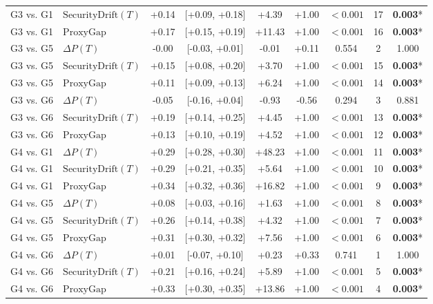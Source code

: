 \begin{table}[t]
\begin{tabular}{llccccccc}
G3 vs. G1 & $\text{SecurityDrift}(T)$ & +0.14 & [+0.09, +0.18] & +4.39 & +1.00 & $<0.001$ & 17 & \textbf{0.003}* \\
G3 vs. G1 & $\text{ProxyGap}$ & +0.17 & [+0.15, +0.19] & +11.43 & +1.00 & $<0.001$ & 16 & \textbf{0.003}* \\
G3 vs. G5 & $\Delta P(T)$ & -0.00 & [-0.03, +0.01] & -0.01 & +0.11 & 0.554 & 2 & 1.000 \\
G3 vs. G5 & $\text{SecurityDrift}(T)$ & +0.15 & [+0.08, +0.20] & +3.70 & +1.00 & $<0.001$ & 15 & \textbf{0.003}* \\
G3 vs. G5 & $\text{ProxyGap}$ & +0.11 & [+0.09, +0.13] & +6.24 & +1.00 & $<0.001$ & 14 & \textbf{0.003}* \\
G3 vs. G6 & $\Delta P(T)$ & -0.05 & [-0.16, +0.04] & -0.93 & -0.56 & 0.294 & 3 & 0.881 \\
G3 vs. G6 & $\text{SecurityDrift}(T)$ & +0.19 & [+0.14, +0.25] & +4.45 & +1.00 & $<0.001$ & 13 & \textbf{0.003}* \\
G3 vs. G6 & $\text{ProxyGap}$ & +0.13 & [+0.10, +0.19] & +4.52 & +1.00 & $<0.001$ & 12 & \textbf{0.003}* \\
G4 vs. G1 & $\Delta P(T)$ & +0.29 & [+0.28, +0.30] & +48.23 & +1.00 & $<0.001$ & 11 & \textbf{0.003}* \\
G4 vs. G1 & $\text{SecurityDrift}(T)$ & +0.29 & [+0.21, +0.35] & +5.64 & +1.00 & $<0.001$ & 10 & \textbf{0.003}* \\
G4 vs. G1 & $\text{ProxyGap}$ & +0.34 & [+0.32, +0.36] & +16.82 & +1.00 & $<0.001$ & 9 & \textbf{0.003}* \\
G4 vs. G5 & $\Delta P(T)$ & +0.08 & [+0.03, +0.16] & +1.63 & +1.00 & $<0.001$ & 8 & \textbf{0.003}* \\
G4 vs. G5 & $\text{SecurityDrift}(T)$ & +0.26 & [+0.14, +0.38] & +4.32 & +1.00 & $<0.001$ & 7 & \textbf{0.003}* \\
G4 vs. G5 & $\text{ProxyGap}$ & +0.31 & [+0.30, +0.32] & +7.56 & +1.00 & $<0.001$ & 6 & \textbf{0.003}* \\
G4 vs. G6 & $\Delta P(T)$ & +0.01 & [-0.07, +0.10] & +0.23 & +0.33 & 0.741 & 1 & 1.000 \\
G4 vs. G6 & $\text{SecurityDrift}(T)$ & +0.21 & [+0.16, +0.24] & +5.89 & +1.00 & $<0.001$ & 5 & \textbf{0.003}* \\
G4 vs. G6 & $\text{ProxyGap}$ & +0.33 & [+0.30, +0.35] & +13.86 & +1.00 & $<0.001$ & 4 & \textbf{0.003}* \\
\bottomrule
\end{tabular}
\end{table}
